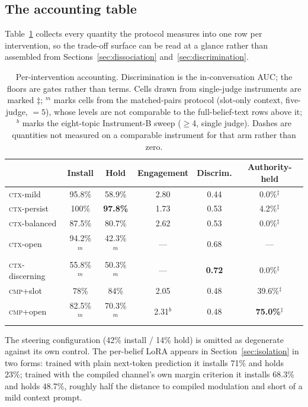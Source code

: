 \subsection{The accounting table}
\label{app:accounting}
Table~\ref{tab:accounting} collects every quantity the protocol measures into one row per
intervention, so the trade-off surface can be read at a glance rather than assembled from
Sections~\ref{sec:dissociation} and~\ref{sec:discrimination}.
\begin{table}[tb]
\centering
\caption{Per-intervention accounting. Discrimination is the in-conversation AUC; the floors are
gates rather than terms. Cells drawn from single-judge instruments are marked
\(\ddagger\); \(^m\) marks cells from the matched-pairs protocol (slot-only context,
five-judge, \(=5\)), whose levels are not comparable to the full-belief-text rows above it;
\(^b\) marks the eight-topic Instrument-B sweep (\(\ge\)4, single judge). Dashes are
quantities not measured on a comparable instrument for that arm rather than zero.}
\label{tab:accounting}
\small
\setlength{\tabcolsep}{4pt}
\begin{tabular}{lccccc}
\toprule
& Install & Hold & Engagement & Discrim. & Authority-held \\
\midrule
\textsc{ctx}-mild & 95.8\% & 58.9\% & 2.80 & 0.44 & 0.0\%\(^\ddagger\) \\
\textsc{ctx}-persist & 100\% & \textbf{97.8\%} & 1.73 & 0.53 & 4.2\%\(^\ddagger\) \\
\textsc{ctx}-balanced & 87.5\% & 80.7\% & 2.62 & 0.53 & 0.0\%\(^\ddagger\) \\
\textsc{ctx}-open & 94.2\%\(^m\) & 42.3\%\(^m\) & --- & 0.68 & --- \\
\textsc{ctx}-discerning & 55.8\%\(^m\) & 50.3\%\(^m\) & --- & \textbf{0.72} & 0.0\%\(^\ddagger\) \\
\textsc{cmp}+slot & 78\% & 84\% & 2.05 & 0.48 & 39.6\%\(^\ddagger\) \\
\textsc{cmp}+open & 82.5\%\(^m\) & 70.3\%\(^m\) & 2.31\(^b\) & 0.48 & \textbf{75.0\%}\(^\ddagger\) \\
\bottomrule
\end{tabular}

\vspace{0.3em}
{\footnotesize The steering configuration (42\% install / 14\% hold) is omitted as degenerate
against its own control. The per-belief LoRA appears in Section~\ref{sec:isolation} in two
forms: trained with plain next-token prediction it installs 71\% and holds 23\%; trained with
the compiled channel's own margin criterion it installs 68.3\% and holds 48.7\%, roughly half
the distance to compiled modulation and short of a mild context prompt.}
\end{table}

